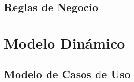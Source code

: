 \documentclass[10pt]{book}
\begin{document}
	
	
	
	
	
	
	
	\chapter{Reglas de Negocio} %
	\label{chapter:rn}
	

	
	\part{Modelo Dinámico}
	
	
	\chapter{Modelo de Casos de Uso} %
	\label{chapter:UC}	
	
	

	
	
	
\end{document}

